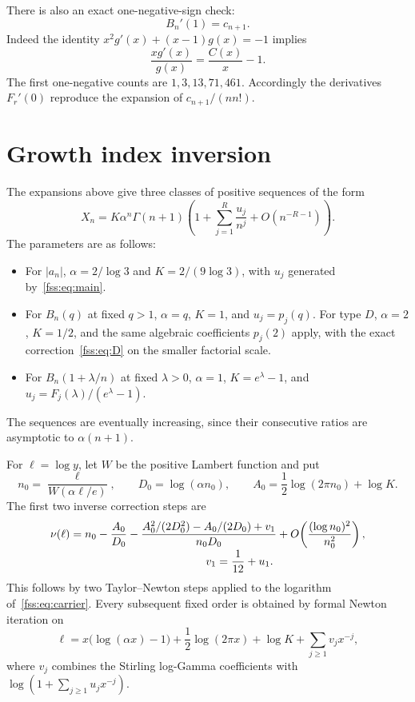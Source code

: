 \documentclass[11pt]{article}
\begin{document}
There is also an exact one-negative-sign check:
\begin{equation}\label{fss:eq:oneminus}
 B_n'(1)=c_{n+1}.
\end{equation}
Indeed the identity $x^2g'(x)+(x-1)g(x)=-1$ implies
\[
 \frac{xg'(x)}{g(x)}=\frac{C(x)}x-1.
\]
The first one-negative counts are $1,3,13,71,461$. Accordingly the derivatives $F_r'(0)$ reproduce the expansion of $c_{n+1}/(nn!)$.

\section{Growth index inversion}\label{fss:sec:inverse}
The expansions above give three classes of positive sequences of the form
\begin{equation}\label{fss:eq:carrier}
 X_n=K\alpha^n\Gamma(n+1)
 \left(1+\sum_{j=1}^R\frac{u_j}{n^j}+O(n^{-R-1})\right).
\end{equation}
The parameters are as follows:
\begin{itemize}
\item For $|a_n|$, $\alpha=2/\log3$ and $K=2/(9\log3)$, with $u_j$ generated by~\eqref{fss:eq:main}.
\item For $B_n(q)$ at fixed $q>1$, $\alpha=q$, $K=1$, and $u_j=p_j(q)$. For type $D$, $\alpha=2$, $K=1/2$, and the same algebraic coefficients $p_j(2)$ apply, with the exact correction~\eqref{fss:eq:D} on the smaller factorial scale.
\item For $B_n(1+\lambda/n)$ at fixed $\lambda>0$, $\alpha=1$, $K=e^\lambda-1$, and $u_j=F_j(\lambda)/(e^\lambda-1)$.
\end{itemize}
The sequences are eventually increasing, since their consecutive ratios are asymptotic to $\alpha(n+1)$.

For $\ell=\log y$, let $W$ be the positive Lambert function and put
\begin{equation}\label{fss:eq:inversebase}
 n_0=\frac{\ell}{W(\alpha\ell/e)},\qquad
 D_0=\log(\alpha n_0),\qquad
 A_0=\frac12\log(2\pi n_0)+\log K.
\end{equation}
The first two inverse correction steps are
\begin{align}\label{fss:eq:inverse}
 \nu(\ell)={}&n_0-\frac{A_0}{D_0}
 -\frac{A_0^2/(2D_0^2)-A_0/(2D_0)+v_1}{n_0D_0}
 +O\!\left(\frac{(\log n_0)^2}{n_0^2}\right),\\[-2pt]
 &\hspace{38mm}v_1=\frac1{12}+u_1.\notag
\end{align}
This follows by two Taylor--Newton steps applied to the logarithm of~\eqref{fss:eq:carrier}. Every subsequent fixed order is obtained by formal Newton iteration on
\begin{equation}\label{fss:eq:invformal}
 \ell=x\bigl(\log(\alpha x)-1\bigr)
 +\frac12\log(2\pi x)+\log K+\sum_{j\ge1}v_jx^{-j},
\end{equation}
where $v_j$ combines the Stirling log-Gamma coefficients with
$\log(1+\sum_{j\ge1}u_jx^{-j})$.
\end{document}
